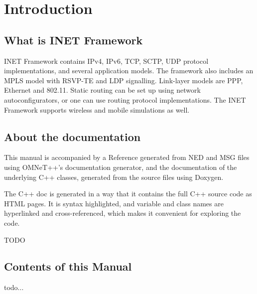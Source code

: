 \chapter{Introduction}
\label{cha:introduction}


\section{What is INET Framework}

INET Framework contains IPv4, IPv6, TCP, SCTP, UDP protocol implementations,
and several application models. The framework also includes an MPLS model
with RSVP-TE and LDP signalling. Link-layer models are PPP, Ethernet and 802.11.
Static routing can be set up using network autoconfigurators, or one can use
routing protocol implementations. The INET Framework supports wireless and
mobile simulations as well.


\section{About the documentation}

This manual is accompanied by a Reference generated from NED and MSG files using
OMNeT++'s documentation generator, and the documentation of the underlying C++ classes,
generated from the source files using Doxygen.

The C++ doc is generated in a way that it contains the full C++ source code
as HTML pages. It is syntax highlighted, and variable and class names are hyperlinked
and cross-referenced, which makes it convenient for exploring the code.


\ifdraft TODO
\section{Contents of this Manual}

todo...
\fi



